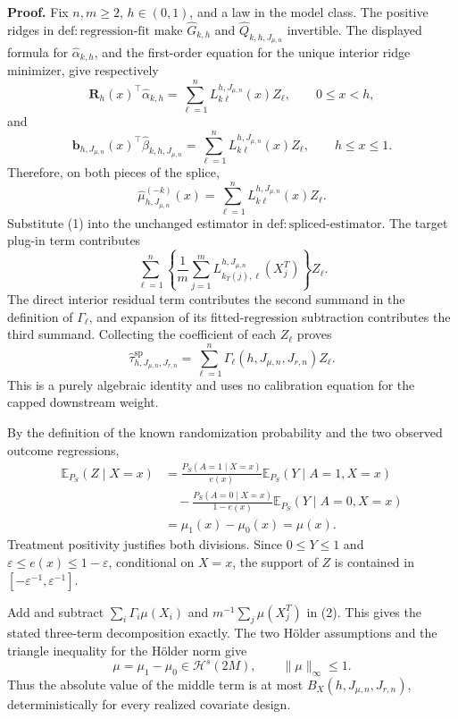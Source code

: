 \textbf{Proof.}
Fix \(n,m\ge2\), \(h\in(0,1)\), and a law in the model class. The positive ridges in \(\mathrm{def:regression\text{-}fit}\) make \(\widehat G_{k,h}\) and \(\widehat Q_{k,h,J_{\mu,n}}\) invertible. The displayed formula for \(\widehat\alpha_{k,h}\), and the first-order equation for the unique interior ridge minimizer, give respectively
\[
\mathbf R_h(x)^\top\widehat\alpha_{k,h}
=\sum_{\ell=1}^nL_{k\ell}^{h,J_{\mu,n}}(x)Z_\ell,
\qquad 0\le x<h,
\]
and
\[
\mathbf b_{h,J_{\mu,n}}(x)^\top\widehat\beta_{k,h,J_{\mu,n}}
=\sum_{\ell=1}^nL_{k\ell}^{h,J_{\mu,n}}(x)Z_\ell,
\qquad h\le x\le1.
\]
Therefore, on both pieces of the splice,
\[
\widehat\mu_{h,J_{\mu,n}}^{(-k)}(x)=\sum_{\ell=1}^nL_{k\ell}^{h,J_{\mu,n}}(x)Z_\ell.
\tag{1}
\]
Substitute (1) into the unchanged estimator in \(\mathrm{def:spliced\text{-}estimator}\). The target plug-in term contributes
\[
\sum_{\ell=1}^n\left\{\frac1m\sum_{j=1}^mL_{k_T(j),\ell}^{h,J_{\mu,n}}(X_j^T)\right\}Z_\ell.
\]
The direct interior residual term contributes the second summand in the definition of \(\Gamma_\ell\), and expansion of its fitted-regression subtraction contributes the third summand. Collecting the coefficient of each \(Z_\ell\) proves
\[
\widehat\tau^{\mathrm{sp}}_{h,J_{\mu,n},J_{r,n}}
=\sum_{\ell=1}^n\Gamma_\ell(h,J_{\mu,n},J_{r,n})Z_\ell.
\tag{2}
\]
This is a purely algebraic identity and uses no calibration equation for the capped downstream weight.

By the definition of the known randomization probability and the two observed outcome regressions,
\[
\begin{aligned}
\mathbb E_{P_S}(Z\mid X=x)
&=\frac{P_S(A=1\mid X=x)}{e(x)}\mathbb E_{P_S}(Y\mid A=1,X=x)\\
&\quad-\frac{P_S(A=0\mid X=x)}{1-e(x)}\mathbb E_{P_S}(Y\mid A=0,X=x)\\
&=\mu_1(x)-\mu_0(x)=\mu(x).
\end{aligned}
\tag{3}
\]
Treatment positivity justifies both divisions. Since \(0\le Y\le1\) and \(\varepsilon\le e(x)\le1-\varepsilon\), conditional on \(X=x\), the support of \(Z\) is contained in \([-\varepsilon^{-1},\varepsilon^{-1}]\).

Add and subtract \(\sum_i\Gamma_i\mu(X_i)\) and \(m^{-1}\sum_j\mu(X_j^T)\) in (2). This gives the stated three-term decomposition exactly. The two Hölder assumptions and the triangle inequality for the Hölder norm give
\[
\mu=\mu_1-\mu_0\in\mathcal H^s(2M),
\qquad \|\mu\|_\infty\le1.
\tag{4}
\]
Thus the absolute value of the middle term is at most \(B_X(h,J_{\mu,n},J_{r,n})\), deterministically for every realized covariate design.

